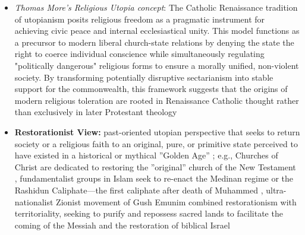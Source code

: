 \documentclass[jou,floatsintext]{apa7}
\begin{document}
\begin{itemize}
\begin{itemize}
\begin{itemize}
        \item \textit{Thomas More’s Religious Utopia concept}: The Catholic Renaissance tradition of utopianism posits religious freedom as a pragmatic instrument for achieving civic peace and internal ecclesiastical unity. This model functions as a precursor to modern liberal church-state relations by denying the state the right to coerce individual conscience while simultaneously regulating "politically dangerous" religious forms to ensure a morally unified, non-violent society. By transforming potentially disruptive sectarianism into stable support for the commonwealth, this framework suggests that the origins of modern religious toleration are rooted in Renaissance Catholic thought rather than exclusively in later Protestant theology \parencite{kesslerReligiousFreedomThomas2002}
        \item \textbf{Restorationist View:} past-oriented utopian perspective that seeks to return society or a religious faith to an original, pure, or primitive state perceived to have existed in a historical or mythical ''Golden Age'' \parencite{geogheganUtopiaReligionMemory2007, sargissonReligiousFundamentalismUtopianism2007}; e.g., Churches of Christ are  dedicated to restoring the ''original'' church of the New Testament \parencite{sargissonReligiousFundamentalismUtopianism2007}, fundamentalist groups in Islam seek to re-enact the Medinan regime or the Rashidun Caliphate---the first caliphate after death of Muhammed \parencite{duttonNonwesternUtopianTraditions2010}, ultra-nationalist Zionist movement of Gush Emunim combined restorationism with territoriality, seeking to purify and repossess sacred lands to facilitate the coming of the Messiah and the restoration of biblical Israel \parencite{sargissonReligiousFundamentalismUtopianism2007}
    \end{itemize}


\end{itemize}
\end{itemize}
\end{document}
